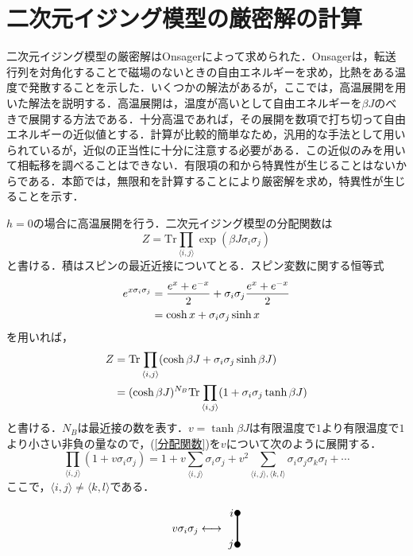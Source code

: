 \documentclass[a4paper,11pt]{jsreport}
\begin{document}
\section{二次元イジング模型の厳密解の計算}
二次元イジング模型の厳密解はOnsagerによって求められた．Onsagerは，転送行列を対角化することで磁場のないときの自由エネルギーを求め，比熱をある温度で発散することを示した．いくつかの解法があるが，ここでは，高温展開を用いた解法を説明する．高温展開は，温度が高いとして自由エネルギーを$\beta J$のべきで展開する方法である．十分高温であれば，その展開を数項で打ち切って自由エネルギーの近似値とする．計算が比較的簡単なため，汎用的な手法として用いられているが，近似の正当性に十分に注意する必要がある．この近似のみを用いて相転移を調べることはできない．有限項の和から特異性が生じることはないからである．本節では，無限和を計算することにより厳密解を求め，特異性が生じることを示す．\par
$h=0$の場合に高温展開を行う．二次元イジング模型の分配関数は
\begin{equation}
  Z = \mathrm{Tr}\prod_{\langle i, j \rangle} \exp{(\beta J \sigma_i \sigma_j)}
\end{equation}
と書ける．積はスピンの最近近接についてとる．スピン変数に関する恒等式
\begin{align}
  e^{x\sigma_i \sigma_j}
   & = \frac{e^x + e^{-x}}{2} + \sigma_i \sigma_j \frac{e^x + e^{-x}}{2} \notag \\
   & = \cosh{x} + \sigma_i \sigma_j \sinh{x}
\end{align}
を用いれば，
\begin{align}
  Z
   & = \mathrm{Tr}\prod_{\langle i, j \rangle}(\cosh{\beta J} + \sigma_i \sigma_j \sinh{\beta J}) \notag                \\
   & = (\cosh{\beta J})^{N_B}\mathrm{Tr}\prod_{\langle i, j \rangle}(1 + \sigma_i \sigma_j \tanh{\beta J}) \label{分配関数}
\end{align}
と書ける．$N_B$は最近接の数を表す．$v = \tanh{\beta J}$は有限温度で$1$より有限温度で$1$より小さい非負の量なので，(\ref{分配関数})を$v$について次のように展開する．
\begin{equation}
  \prod_{\langle i, j \rangle}(1 + v \sigma_i \sigma_j)
  = 1 + v \sum_{\langle i, j \rangle} \sigma_i \sigma_j
  + v^2 \sum_{\langle i, j \rangle, \langle k, l \rangle} \sigma_i \sigma_j \sigma_k \sigma_l + \cdots
\end{equation}
ここで，$\langle i, j \rangle \neq \langle k, l \rangle$である．

\begin{equation}
  v\sigma_i \sigma_j \longleftrightarrow
  \begin{tikzpicture}[baseline={([yshift=-.5ex]current bounding box.center)}]
    \draw[very thick](0,0)--(0,-1);
    \fill(0,0)circle(0.1)node[left]{$i$};
    \fill(0,-1)circle(0.1)node[left]{$j$};
  \end{tikzpicture}
\end{equation}
\end{document}
